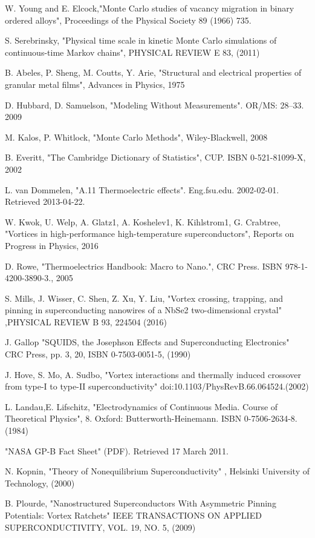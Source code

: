\begin{thebibliography}{10}
 W. Young and E. Elcock,"Monte Carlo studies of vacancy migration in binary ordered alloys", Proceedings of the Physical Society 89 (1966) 735.

 S. Serebrinsky, "Physical time scale in kinetic Monte Carlo simulations of continuous-time Markov chains", PHYSICAL REVIEW E 83, (2011)

 B. Abeles, P. Sheng, M. Coutts, Y. Arie, "Structural and electrical properties of granular metal films", Advances in Physics, 1975

 D. Hubbard, D. Samuelson, "Modeling Without Measurements". OR/MS: 28–33. 2009

 M. Kalos, P. Whitlock, "Monte Carlo Methods", Wiley-Blackwell, 2008

 B. Everitt, "The Cambridge Dictionary of Statistics", CUP. ISBN 0-521-81099-X, 2002

 L. van Dommelen, "A.11 Thermoelectric effects". Eng.fsu.edu. 2002-02-01. Retrieved 2013-04-22.

 W. Kwok, U. Welp, A. Glatz1, A. Koshelev1, K. Kihlstrom1, G. Crabtree, "Vortices in high-performance high-temperature superconductors", Reports on Progress in Physics, 2016

 D. Rowe, "Thermoelectrics Handbook: Macro to Nano.", CRC Press. ISBN 978-1-4200-3890-3., 2005

 S. Mills, J. Wisser, C. Shen, Z. Xu, Y. Liu, "Vortex crossing, trapping, and pinning in superconducting nanowires of a NbSe2 two-dimensional crystal" ,PHYSICAL REVIEW B 93, 224504 (2016)

 J. Gallop  "SQUIDS, the Josephson Effects and Superconducting Electronics" CRC Press, pp. 3, 20, ISBN 0-7503-0051-5, (1990)

 J. Hove, S. Mo, A. Sudbo, "Vortex interactions and thermally induced crossover from type-I to type-II superconductivity" doi:10.1103/PhysRevB.66.064524.(2002)

 L. Landau,E. Lifschitz, "Electrodynamics of Continuous Media. Course of Theoretical Physics", 8. Oxford: Butterworth-Heinemann. ISBN 0-7506-2634-8.(1984)

 "NASA GP-B Fact Sheet" (PDF). Retrieved 17 March 2011.

 N. Kopnin, "Theory of Nonequilibrium Superconductivity" , Helsinki University of Technology, (2000)

 B. Plourde, "Nanostructured Superconductors With Asymmetric Pinning Potentials: Vortex Ratchets" IEEE TRANSACTIONS ON APPLIED SUPERCONDUCTIVITY, VOL. 19, NO. 5, (2009)

\end{thebibliography}
